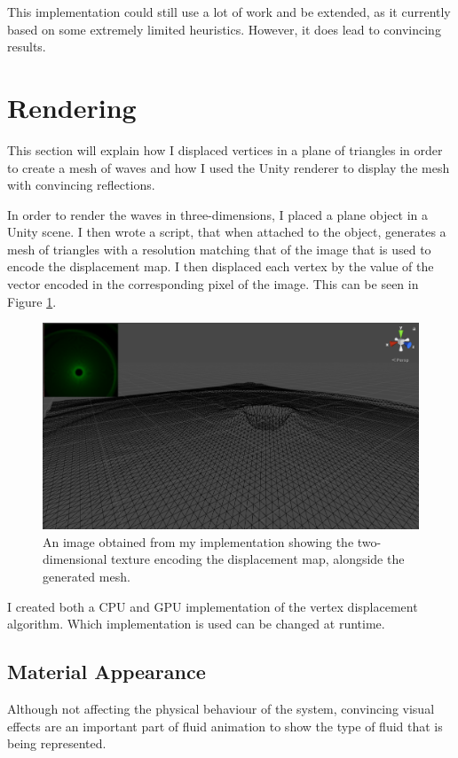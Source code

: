 \documentclass[12pt,a4paper,twoside]{report}
\begin{document}
This implementation could still use a lot of work and be extended, as it
currently based on some extremely limited heuristics. However, it does lead to
convincing results.

\section{Rendering}

This section will explain how I displaced vertices in a plane of triangles in
order to create a mesh of waves and how I used the Unity renderer to display
the mesh with convincing reflections.

In order to render the waves in three-dimensions, I placed a plane object in a
Unity scene. I then wrote a script, that when attached to the object, generates
a mesh of triangles with a resolution matching that of the image that is used
to encode the displacement map. I then displaced each vertex by the value
of the vector encoded in the corresponding pixel of the image. This can be seen
in Figure \ref{fig:vertex_example}.

\begin{figure}[h]
\centering
\includegraphics[width=0.8\linewidth]{vertex_example}
\caption{An image obtained from my implementation showing the two-dimensional
texture encoding the displacement map, alongside the generated mesh.}
\label{fig:vertex_example}
\end{figure}

I created both a CPU and GPU implementation of the vertex displacement
algorithm. Which implementation is used can be changed at runtime.

\subsection{Material Appearance}

Although not affecting the physical behaviour of the system, convincing visual
effects are an important part of fluid animation to show the type of fluid that
is being represented.
\end{document}
